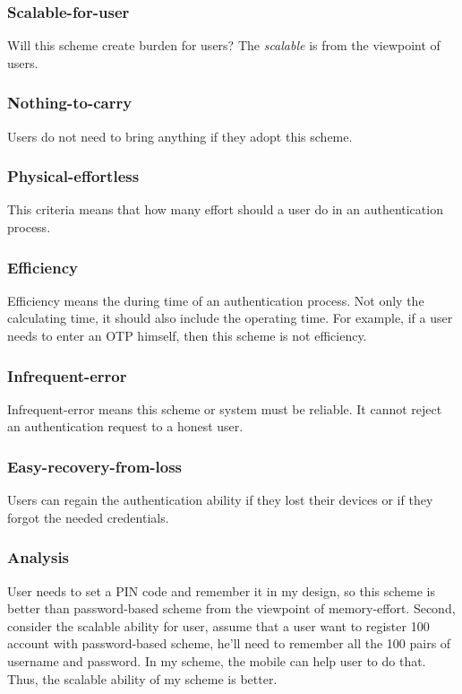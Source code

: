 \begin{CJK}{Bg5}{bsmi}
\subsubsection{Scalable-for-user}

Will this scheme create burden for users? The \emph{scalable} is from the viewpoint of users.

\subsubsection{Nothing-to-carry}

Users do not need to bring anything if they adopt this scheme.

\subsubsection{Physical-effortless}

This criteria means that how many effort should a user do in an authentication process.

\subsubsection{Efficiency}

Efficiency means the during time of an authentication process. Not only the calculating time, it should also include the operating time. For example, if a user needs to enter an OTP himself, then this scheme is not efficiency.

\subsubsection{Infrequent-error}

Infrequent-error means this scheme or system must be reliable. It cannot reject an authentication request to a honest user.

\subsubsection{Easy-recovery-from-loss}

Users can regain the authentication ability if they lost their devices or if they forgot the needed credentials.

\subsubsection{Analysis}

User needs to set a PIN code and remember it in my design, so this scheme is better than password-based scheme from the viewpoint of memory-effort. Second, consider the scalable ability for user, assume that a user want to register 100 account with password-based scheme, he'll need to remember all the 100 pairs of username and password. In my scheme, the mobile can help user to do that. Thus, the scalable ability of my scheme is better.


\end{CJK}
